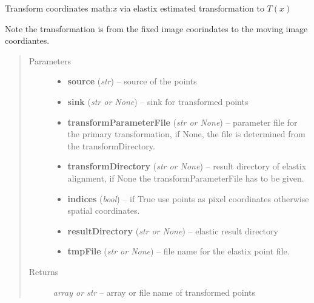 \documentclass[letterpaper,10pt,english]{sphinxmanual}
\begin{document}

\begin{fulllineitems}
\label{api/ClearMap.Alignment:ClearMap.Alignment.Elastix.transformPoints}
Transform coordinates math:\emph{x} via elastix estimated transformation to \(T(x)\)

Note the transformation is from the fixed image coorindates to the moving image coordiantes.
\begin{quote}\begin{description}
\item[{Parameters}] \leavevmode\begin{itemize}
\item {} 
\textbf{source} (\emph{str}) --
source of the points

\item {} 
\textbf{sink} (\emph{str or None}) --
sink for transformed points

\item {} 
\textbf{transformParameterFile} (\emph{str or None}) --
parameter file for the primary transformation, if None, the file is determined from the transformDirectory.

\item {} 
\textbf{transformDirectory} (\emph{str or None}) --
result directory of elastix alignment, if None the transformParameterFile has to be given.

\item {} 
\textbf{indices} (\emph{bool}) --
if True use points as pixel coordinates otherwise spatial coordinates.

\item {} 
\textbf{resultDirectory} (\emph{str or None}) --
elastic result directory

\item {} 
\textbf{tmpFile} (\emph{str or None}) --
file name for the elastix point file.

\end{itemize}

\item[{Returns}] \leavevmode
\emph{array or str} --
array or file name of transformed points

\end{description}\end{quote}

\end{fulllineitems}
\end{document}

